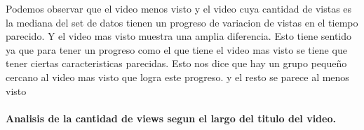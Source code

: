             \begin{figure}[ht]
            \end{figure}
        \FloatBarrier
        Podemos observar que el video menos visto y el video cuya cantidad de
        vistas es la mediana del set de datos tienen un progreso de variacion de
        vistas en el tiempo parecido. Y el video mas visto muestra una amplia
        diferencia. Esto tiene sentido ya que para tener un progreso como el que
        tiene el video mas visto se tiene que tener ciertas caracteristicas
        parecidas. Esto nos dice que hay un grupo pequeño cercano al video mas
        visto que logra este progreso. y el resto se parece al menos visto

        \newpage
        \paragraph{Analisis de la cantidad de views segun el largo del titulo del video.}

